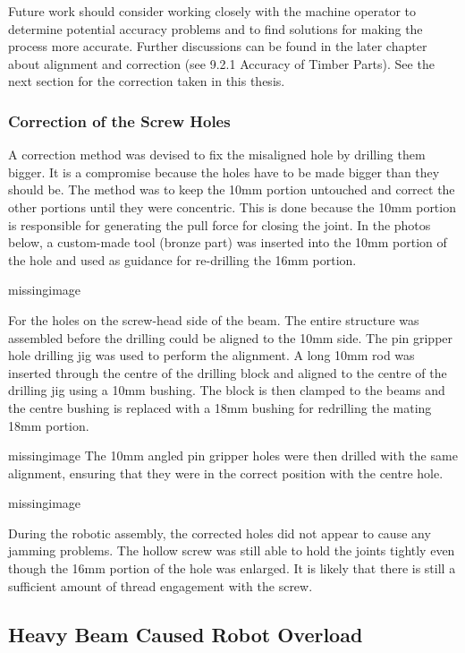 Future work should consider working closely with the machine operator to determine potential accuracy problems and to find solutions for making the process more accurate. Further discussions can be found in the later chapter about alignment and correction (see 9.2.1 Accuracy of Timber Parts).
See the next section for the correction taken in this thesis.

\subsubsection{Correction of the Screw Holes}
\label{subsubsection:exploration-4-correction-of-the-screw-holes}

A correction method was devised to fix the misaligned hole by drilling them bigger. It is a compromise because the holes have to be made bigger than they should be. 
The method was to keep the 10mm portion untouched and correct the other portions until they were concentric. This is done because the 10mm portion is responsible for generating the pull force for closing the joint. In the photos below, a custom-made tool (bronze part) was inserted into the 10mm portion of the hole and used as guidance for re-drilling the 16mm portion.

missingimage

For the holes on the screw-head side of the beam. The entire structure was assembled before the drilling could be aligned to the 10mm side. The pin gripper hole drilling jig was used to perform the alignment. A long 10mm rod was inserted through the centre of the drilling block and aligned to the centre of the drilling jig using a 10mm bushing. The block is then clamped to the beams and the centre bushing is replaced with a 18mm bushing for redrilling the mating 18mm portion. 

missingimage
The 10mm angled pin gripper holes were then drilled with the same alignment, ensuring that they were in the correct position with the centre hole. 

missingimage

During the robotic assembly, the corrected holes did not appear to cause any jamming problems. The hollow screw was still able to hold the joints tightly even though the 16mm portion of the hole was enlarged. It is likely that there is still a sufficient amount of thread engagement with the screw.

\subsection{Heavy Beam Caused Robot Overload}
\label{subsection:exploration-4-heavy-beam-caused-robot-overload}

